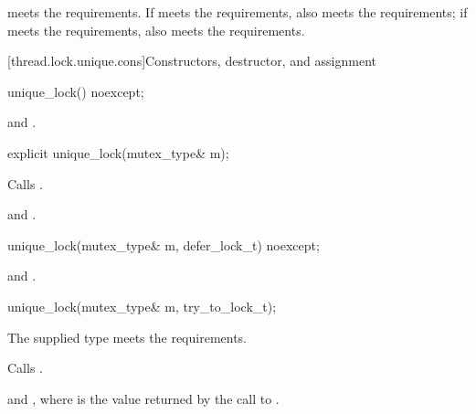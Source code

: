 \pnum
\begin{note}
 meets the  requirements. If 
meets the  requirements,
 also meets the  requirements;
if 
meets the  requirements,
 also meets the  requirements.
\end{note}

[thread.lock.unique.cons]{Constructors, destructor, and assignment}

%
\begin{itemdecl}
unique_lock() noexcept;
\end{itemdecl}

\begin{itemdescr}
\pnum
\ensures
{} and .
\end{itemdescr}

%
\begin{itemdecl}
explicit unique_lock(mutex_type& m);
\end{itemdecl}

\begin{itemdescr}
\pnum
\effects
Calls .

\pnum
\ensures
{} and .
\end{itemdescr}

%
\begin{itemdecl}
unique_lock(mutex_type& m, defer_lock_t) noexcept;
\end{itemdecl}

\begin{itemdescr}
\pnum
\ensures
{} and .
\end{itemdescr}

%
\begin{itemdecl}
unique_lock(mutex_type& m, try_to_lock_t);
\end{itemdecl}

\begin{itemdescr}
\pnum
\expects
The supplied  type meets the 
requirements.

\pnum
\effects
Calls .

\pnum
\ensures
{} and ,
where  is the value returned by the call to .
\end{itemdescr}


